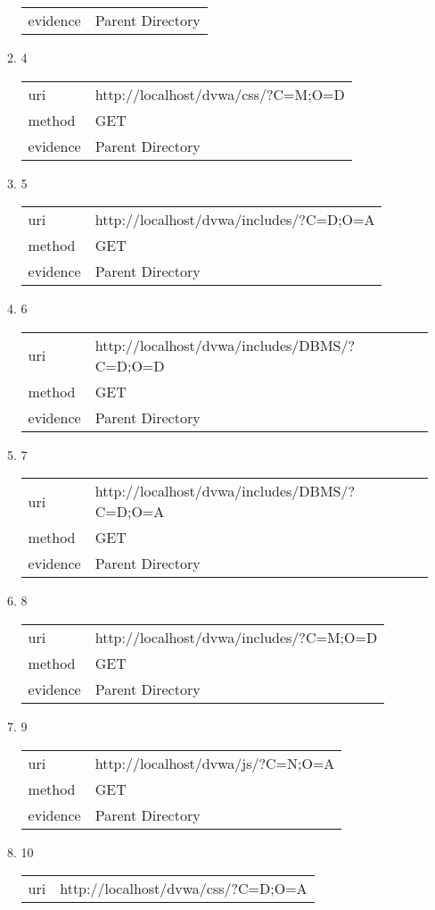 \documentclass[10pt]{article}
\begin{document}
\begin{itemize}
\begin{enumerate}
\begin{tabular}{| l | p{12cm}}
evidence & Parent Directory \\
\end{tabular}
\item[] 4
\begin{tabular}{| l | p{12cm}}
uri & http://localhost/dvwa/css/?C=M;O=D \\
method & GET \\
evidence & Parent Directory \\
\end{tabular}
\item[] 5
\begin{tabular}{| l | p{12cm}}
uri & http://localhost/dvwa/includes/?C=D;O=A \\
method & GET \\
evidence & Parent Directory \\
\end{tabular}
\item[] 6
\begin{tabular}{| l | p{12cm}}
uri & http://localhost/dvwa/includes/DBMS/?C=D;O=D \\
method & GET \\
evidence & Parent Directory \\
\end{tabular}
\item[] 7
\begin{tabular}{| l | p{12cm}}
uri & http://localhost/dvwa/includes/DBMS/?C=D;O=A \\
method & GET \\
evidence & Parent Directory \\
\end{tabular}
\item[] 8
\begin{tabular}{| l | p{12cm}}
uri & http://localhost/dvwa/includes/?C=M;O=D \\
method & GET \\
evidence & Parent Directory \\
\end{tabular}
\item[] 9
\begin{tabular}{| l | p{12cm}}
uri & http://localhost/dvwa/js/?C=N;O=A \\
method & GET \\
evidence & Parent Directory \\
\end{tabular}
\item[] 10
\begin{tabular}{| l | p{12cm}}
uri & http://localhost/dvwa/css/?C=D;O=A \\

\end{tabular}
\end{enumerate}
\end{itemize}
\end{document}
